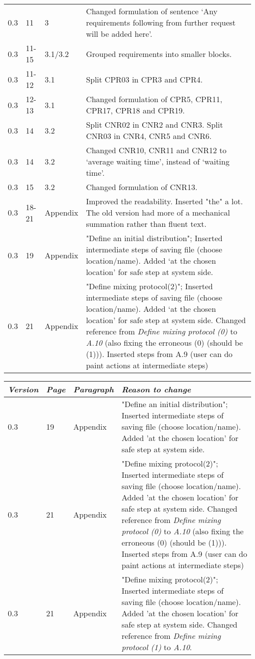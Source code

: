 \begin{tabular}{|l|l|l|p{11cm}|}
    0.3 & 11 & 3 & Changed formulation of sentence `Any requirements following from further request will be added here'.\\
    0.3 & 11-15 & 3.1/3.2 & Grouped requirements into smaller blocks.\\
    0.3 & 11-12 & 3.1 & Split CPR03 in CPR3 and CPR4.\\
    0.3 & 12-13 & 3.1 & Changed formulation of CPR5, CPR11, CPR17, CPR18 and CPR19.\\
    0.3 & 14 & 3.2 & Split CNR02 in CNR2 and CNR3. Split CNR03 in CNR4, CNR5 and CNR6.\\
    0.3 & 14 & 3.2 & Changed CNR10, CNR11 and CNR12 to `average waiting time', instead of `waiting time'.\\
    0.3 & 15 & 3.2 & Changed formulation of CNR13.\\
    0.3 & 18-21 & Appendix & Improved the readability. Inserted "the" a lot. The old version had more of a mechanical summation rather than fluent text.\\
    0.3 & 19 & Appendix & "Define an initial distribution"; Inserted intermediate steps of saving file (choose location/name). Added `at the chosen location' for safe step at system side.\\
    0.3 & 21 & Appendix & "Define mixing protocol(2)"; Inserted intermediate steps of saving file (choose location/name). Added `at the chosen location' for safe step at system side. Changed reference from \emph{Define mixing protocol (0)} to \emph{A.10} (also fixing the erroneous (0) (should be (1))). Inserted steps from A.9 (user can do paint actions at intermediate steps) \\
    \hline
\end{tabular}
 \begin{tabular}{|l|l|l|p{11cm}|}
    \hline
    \emph{Version} & \emph{Page} &   \emph{Paragraph}    &   \emph{Reason to change}\\
    \hline
    0.3 & 19 & Appendix & "Define an initial distribution"; Inserted intermediate steps of saving file (choose location/name). Added 'at the chosen location' for safe step at system side.\\
    0.3 & 21 & Appendix & "Define mixing protocol(2)"; Inserted intermediate steps of saving file (choose location/name). Added 'at the chosen location' for safe step at system side. Changed reference from \emph{Define mixing protocol (0)} to \emph{A.10} (also fixing the erroneous (0) (should be (1))). Inserted steps from A.9 (user can do paint actions at intermediate steps) \\
    0.3 & 21 & Appendix & "Define mixing protocol(2)"; Inserted intermediate steps of saving file (choose location/name). Added 'at the chosen location' for safe step at system side. Changed reference from \emph{Define mixing protocol (1)} to \emph{A.10}.\\
    \hline
\end{tabular}
